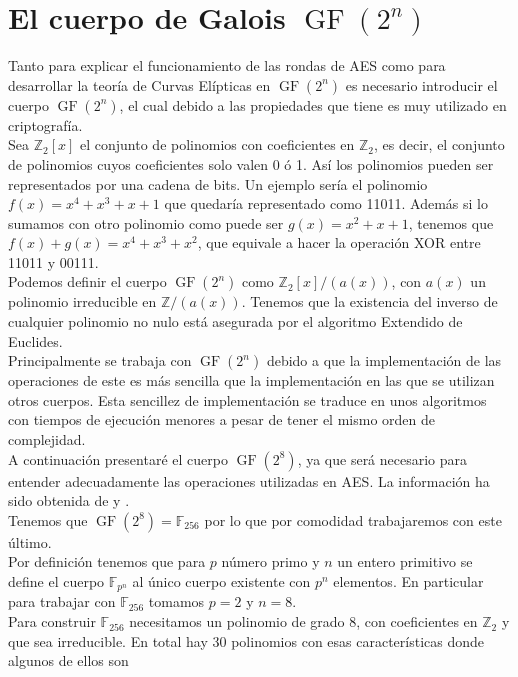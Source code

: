 \section{El cuerpo de Galois $\operatorname{GF}(2^n)$}
Tanto para explicar el funcionamiento de las rondas de AES como para desarrollar la teoría de Curvas Elípticas en $\operatorname{GF}(2^n)$ es necesario introducir el cuerpo $\operatorname{GF}(2^n)$, el cual debido a las propiedades que tiene es muy utilizado en criptografía.\\
Sea $\mathbb{Z}_2[x]$ el conjunto de polinomios con coeficientes en $\mathbb{Z}_2$, es decir, el conjunto de polinomios cuyos coeficientes solo valen 0 ó 1. Así los polinomios pueden ser representados por una cadena de bits.
 Un ejemplo sería el polinomio $f(x)=x^4+x^3+x+1$ que quedaría representado como 11011. 
Además si lo sumamos con otro polinomio como puede ser $g(x)=x^2+x+1$, tenemos que $f(x)+g(x)=x^4+x^3+x^2$, que equivale a hacer la operación XOR entre 11011 y 00111.\\
Podemos definir el cuerpo $\operatorname{GF}(2^n)$ como $\mathbb{Z}_2[x]/(a(x))$, con $a(x)$ un polinomio irreducible en $\mathbb{Z}/(a(x))$. Tenemos que la existencia del inverso de cualquier polinomio no nulo está asegurada por el algoritmo Extendido de Euclides.\\ 
Principalmente se trabaja con $\operatorname{GF}(2^n)$ debido a que la implementación de las operaciones de este es más sencilla que la implementación en las que se utilizan otros cuerpos. Esta sencillez de implementación se traduce en unos algoritmos con tiempos de ejecución menores a pesar de tener el mismo orden de complejidad.\\
A continuación presentaré el cuerpo $\operatorname{GF}(2^8)$, ya que será necesario para entender adecuadamente las operaciones utilizadas en AES. La información ha sido obtenida de \cite{criptografia} y \cite{dem1}.\\
Tenemos que $\operatorname{GF}(2^8)=\mathbb{F}_{256}$ por lo que por comodidad trabajaremos con este último.\\
Por definición tenemos que para $p$ número primo y $n$ un entero primitivo se define el cuerpo $\mathbb{F}_{p^n}$ al único cuerpo existente con $p^n$ elementos. En particular para trabajar con $\mathbb{F}_{256}$ tomamos $p=2$ y $n=8$.\\
Para construir $\mathbb{F}_{256}$ necesitamos un polinomio de grado 8, con coeficientes en $\mathbb{Z}_2$ y que sea irreducible. En total hay 30 polinomios con esas características donde algunos de ellos son 
